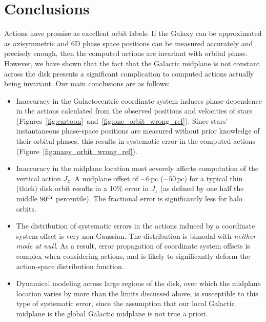 \documentclass[twocolumn]{aastex62}
\newcommand{\pc}{\text{pc}}
\newcommand{\uth}{\textsuperscript{th}}
\begin{document}
\section{Conclusions}\label{sec:conclusion}
Actions have promise as excellent orbit labels. If the Galaxy can be
approximated as axisymmetric and 6D phase space positions can be measured
accurately and precisely enough, then the computed actions are invariant with
orbital phase. However, we have shown that the fact that the Galactic midplane
is not constant across the disk presents a significant complication to
computed actions actually being invariant. Our main conclusions are as
follows:

\begin{itemize}
\item Inaccuracy in the Galactocentric coordinate
system induces phase-dependence in the actions calculated from the observed
positions and velocities of stars
(Figures~\ref{fig:cartoon}~and~\ref{fig:one_orbit_wrong_ref}). Since stars'
instantaneous phase-space positions are measured without prior knowledge of
their orbital phases, this results in systematic error in the computed actions
(Figure~\ref{fig:many_orbit_wrong_ref}).

\item Inaccuracy in the midplane location most severely affects computation of
the vertical action $J_z$.  A midplane offset of $\sim6\,\pc$ ($\sim50\,\pc$)
for a typical thin (thick) disk orbit results in a  $10\%$ error in $J_z$ (as
defined by one half the middle $90\uth$ percentile). The fractional error is
significantly less for halo orbits.

\item The distribution of systematic errors in the actions induced by a
coordinate system offset is very non-Gaussian. The distribution is bimodal
with \emph{neither mode at null}. As a result, error propagation of coordinate
system offsets is complex when considering actions, and is likely to
significantly deform the action-space distribution function.

\item Dynamical modeling across large regions of the disk, over which the
midplane location varies by more than the limits discussed above, is
susceptible to this type of systematic error, since the assumption that our
local Galactic midplane is the global Galactic midplane is not true a
priori.


\end{itemize}
\end{document}
